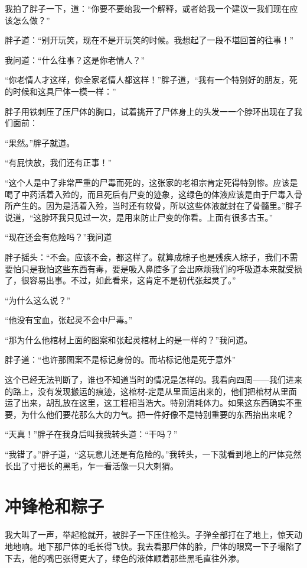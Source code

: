 我拍了胖子一下，道：“你要不要绐我一个解释，或者给我一个建议一我们现在应该怎么做？”

胖子道：“别开玩笑，现在不是开玩笑的时候。我想起了一段不堪回首的往事！”

我问道：“什么往事？这是你老情人？”

“你老情人才这样，你全家老情人都这样！”胖子道，“我有一个特别好的朋友，死的时候和这具尸体一模一样：”

胖子用铁刺压了压尸体的胸口，试着挑开了尸体身上的头发一一个脖环出现在了我们面前：

“果然。”胖子就道。

“有屁快放，我们还有正事！”

“这个人是中了非常严重的尸毒而死的，这张家的老祖宗肯定死得特别惨。应该是喝了中药活着入殓的，而且死后有尸变的迹象，这绿色的体液应该是由于尸毒入骨所产生的。因为是活着入殓，当时还有软骨，所以这些体液就封在了骨髓里。”胖子说道，“这脖环我只见过一次，是用来防止尸变的你看。上面有很多古玉。”

“现在还会有危险吗？”我问道

胖子摇头：“不会。应该不会，都这样了。就算成棕子也是残疾人棕子，我们不需要怕只是我怕这些东西有毒，要是吸入鼻腔多了会出麻烦我们的呼吸道本来就受损了，很容易出事。不过，如此看来，这肯定不是初代张起灵了。”

“为什么这么说？”

“他没有宝血，张起灵不会中尸毒。”

“那为什么他棺材上面的图案和张起灵棺材上的是一样的？”我问道。

胖子道：“也许那图案不是标记身份的。而坫标记他是死于意外”

这个已经无法判断了，谁也不知道当时的情况是怎样的。我看向四周——我们进来的路上，没有发现搬运的痕迹，这棺材-定是从里面运出来的，他们把棺材从里面运了出来，胡乱放在这里，这工程相当浩大。特别消耗体力。如果这东西确实不重要，为什么他们要花那么大的力气。把一件好像不是特别重要的东西抬出来呢？

“天真！”胖子在我身后叫我我转头道：“干吗？”

“我错了。”胖子道，“这玩意儿还是有危险的。”我转头，一下就看到地上的尸体竞然长出了寸把长的黑毛，乍一看活像一只大刺猬。

\chapter{冲锋枪和粽子}

我大叫了一声，举起枪就开，被胖子一下压住枪头。子弹全部打在了地上，惊天动地地响。地下那尸体的毛长得飞快。我去看那尸体的脸，尸体的眼窝一下子塌陷了下去，他的嘴巴张得更大了，绿色的液体顺着那些黑毛直往外渗。


